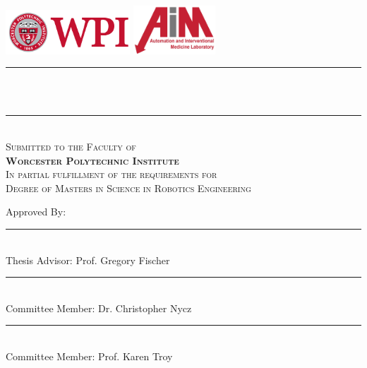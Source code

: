 \begin{titlepage}
    \includegraphics[width=0.35\textwidth]{Figures/WPILogo.png} 
    \hspace{0.3\textwidth}
    \includegraphics[width=0.23\textwidth]{Figures/WPIAIMLogo.png}
    \begin{center}
        \rule{\linewidth}{1pt}
        \\[0.2cm]
        {\huge \textbf{\@title}}
        \\[0.1cm]
        \rule{\linewidth}{1pt}

        \textsc{\LARGE \textbf{\@author}} \\
        \textsc{Submitted to the Faculty of}\\
        \textsc{\large \textbf{Worcester Polytechnic Institute}} \\
        \textsc{In partial fulfillment of the requirements for} \\
        \textsc{\large Degree of Masters in Science in Robotics Engineering}
    \end{center}
    Approved By:

    \vspace{1cm}
    \noindent\rule{0.6\linewidth}{0.4pt} \\
    \hspace{1cm} Thesis Advisor: Prof. Gregory Fischer

    \vspace{1cm}
    \noindent\rule{0.6\linewidth}{0.4pt} \\
    Committee Member: Dr. Christopher Nycz

    \vspace{1cm}
    \noindent\rule{0.6\linewidth}{0.4pt} \\
    \hspace{1cm} Committee Member: Prof. Karen Troy

    \vfill
    \begin{center}
        \large \@date
    \end{center}
             
 \end{titlepage}